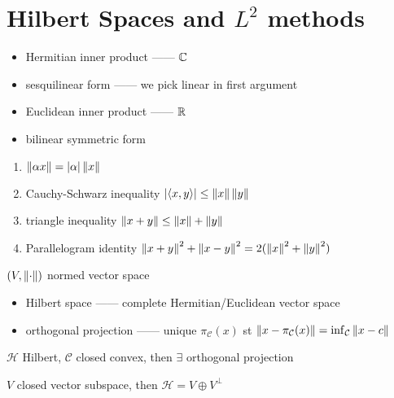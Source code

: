 \section{Hilbert Spaces and $L^2$ methods}\label{sec:hilbert-spaces-andmethods}

\begin{itemize}
    \item Hermitian inner product ------ $\mathbb{C}$
    \item sesquilinear form ------ we pick linear in first argument
    \item Euclidean inner product ------ $\mathbb{R}$
    \item bilinear symmetric form
\end{itemize}

\begin{lemma}
    \begin{enumerate}
        \item $\left\lVert\alpha x\right\rVert = |\alpha|\left\lVert x\right\rVert$
        \item Cauchy-Schwarz inequality $|\langle x, y \rangle| \leq \left\lVert x\right\rVert\left\lVert y\right\rVert$
        \item triangle inequality $\left\lVert x + y\right\rVert  \leq \left\lVert x\right\rVert + \left\lVert y\right\rVert$
        \item Parallelogram identity $\left\lVert x + y\right\rVert^2 + \left\lVert x - y\right\rVert^2 = 2(\left\lVert x\right\rVert^2 + \left\lVert y\right\rVert^2)$
    \end{enumerate}
\end{lemma}

\begin{cor}
    $(V, \left\lVert\cdot\right\rVert)$ normed vector space
\end{cor}

\begin{itemize}
    \item Hilbert space ------ complete Hermitian/Euclidean vector space
    \item orthogonal projection ------ unique $\pi_{\mathcal{C}}(x)$ st $\left\lVert x - \pi_\mathcal{C}(x)\right\rVert = \inf_\mathcal{C}\left\lVert x - c\right\rVert$
\end{itemize}

\begin{prop}
    $\mathcal{H}$ Hilbert, $\mathcal{C}$ closed convex, then $\exists$ orthogonal projection
\end{prop}

\begin{cor}
    $V$ closed vector subspace, then $\mathcal{H} = V \oplus V^\perp$
\end{cor}

